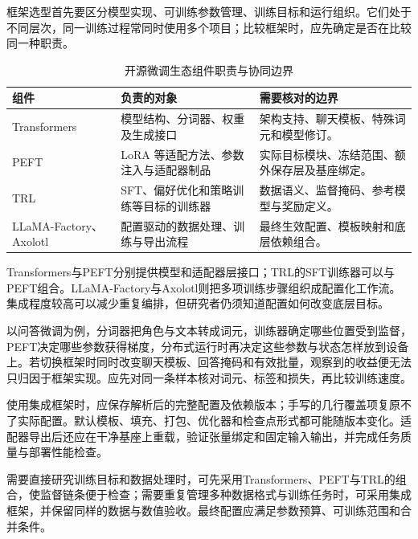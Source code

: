 \documentclass[../textbook.tex]{subfiles}
\begin{document}
框架选型首先要区分模型实现、可训练参数管理、训练目标和运行组织。它们处于不同层次，同一训练过程常同时使用多个项目；比较框架时，应先确定是否在比较同一种职责。

\begin{table}[htbp]
\centering
\caption{开源微调生态组件职责与协同边界}
\label{tab:peft-frameworks}
\begin{tabularx}{\linewidth}{p{28mm}XX}
\toprule 组件 & 负责的对象 & 需要核对的边界\\\midrule
Transformers & 模型结构、分词器、权重及生成接口 & 架构支持、聊天模板、特殊词元和模型修订。\\
PEFT & LoRA 等适配方法、参数注入与适配器制品 & 实际目标模块、冻结范围、额外保存层及基座绑定。\\
TRL & SFT、偏好优化和策略训练等目标的训练器 & 数据语义、监督掩码、参考模型与奖励定义。\\
LLaMA-Factory、Axolotl & 配置驱动的数据处理、训练与导出流程 & 最终生效配置、模板映射和底层依赖组合。\\
\bottomrule
\end{tabularx}
\end{table}
Transformers与PEFT分别提供模型和适配器层接口\cite{HuggingfaceTransformers2018,huggingfacePEFT2023}；TRL的SFT训练器可以与PEFT组合\cite{huggingface2026trlframework}。LLaMA-Factory与Axolotl则把多项训练步骤组织成配置化工作流\cite{llamafactory2026framework,axolotl2026framework}。集成程度较高可以减少重复编排，但研究者仍须知道配置如何改变底层目标。

以问答微调为例，分词器把角色与文本转成词元，训练器确定哪些位置受到监督，PEFT决定哪些参数获得梯度，分布式运行时再决定这些参数与状态怎样放到设备上。若切换框架时同时改变聊天模板、回答掩码和有效批量，观察到的收益便无法只归因于框架实现。应先对同一条样本核对词元、标签和损失，再比较训练速度。

使用集成框架时，应保存解析后的完整配置及依赖版本；手写的几行覆盖项复原不了实际配置。默认模板、填充、打包、优化器和检查点形式都可能随版本变化。适配器导出后还应在干净基座上重载，验证张量绑定和固定输入输出，并完成任务质量与部署性能检查。

需要直接研究训练目标和数据处理时，可先采用Transformers、PEFT与TRL的组合，使监督链条便于检查；需要重复管理多种数据格式与训练任务时，可采用集成框架，并保留同样的数据与数值验收。最终配置应满足参数预算、可训练范围和合并条件。

\chapterreferences
\myendchapterdocument
\end{document}
